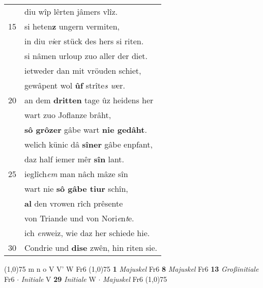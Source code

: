 \documentclass[8pt,a4paper,notitlepage]{article}
\begin{document}
\begin{table}[ht]
\begin{minipage}[t]{0.5\linewidth}
\begin{tabular}{rl}
 & diu wîp lêrten jâmers vlîz.\\ 
15 & si heten\textbf{z} ungern vermiten,\\ 
 & in diu \textit{vi}er stück des hers si riten.\\ 
 & si nâmen urloup zuo aller der diet.\\ 
 & ietweder dan mit vröuden schiet,\\ 
 & gewâpent wol \textbf{ûf} strîte\textit{s w}er.\\ 
20 & an dem \textbf{dritten} tage ûz heidens her\\ 
 & wart zuo Joflanze brâht,\\ 
 & \textbf{sô grôzer} gâbe wart \textbf{nie gedâht}.\\ 
 & welich künic dâ \textbf{sîner} gâbe enpfant,\\ 
 & daz half iemer mêr \textbf{sîn} lant.\\ 
25 & ieglîch\textit{em} man nâch mâze sîn\\ 
 & wart nie \textbf{sô gâbe tiur} schîn,\\ 
 & \textbf{al} den vrowen rîch prêsente\\ 
 & von Triande und von Nori\textit{e}n\textit{t}e.\\ 
 & ich \textit{en}weiz, wie daz her schiede hie.\\ 
30 & Condrie und \textbf{dise} zwên, hin riten sie.\\ 
\end{tabular}
\scriptsize
\line(1,0){75} \newline
m n o V V' W Fr6 \newline
\line(1,0){75} \newline
\textbf{1} \textit{Majuskel} Fr6  \textbf{8} \textit{Majuskel} Fr6  \textbf{13} \textit{Großinitiale} Fr6   $\cdot$ \textit{Initiale} V  \textbf{29} \textit{Initiale} W   $\cdot$ \textit{Majuskel} Fr6  \newline
\line(1,0){75} \newline

\end{minipage}
\end{table}
\end{document}
